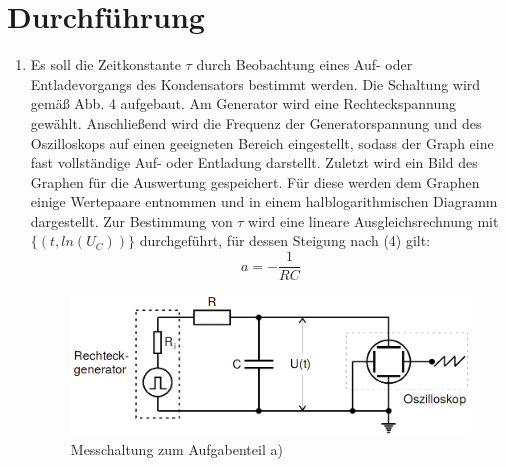 \section{Durchführung}
\label{sec:Durchführung}


\renewcommand{\labelenumi}{\alph{enumi})}
\begin{enumerate}
  \item Es soll die Zeitkonstante $\tau$ durch Beobachtung eines Auf- oder Entladevorgangs
  des Kondensators bestimmt werden. Die Schaltung wird gemäß Abb. 4 aufgebaut. Am Generator wird eine Rechteckspannung gewählt.
  Anschließend wird die Frequenz der Generatorspannung und des Oszilloskops auf einen
  geeigneten Bereich eingestellt, sodass der Graph eine fast vollständige Auf- oder Entladung darstellt. Zuletzt wird ein Bild des Graphen für die
  Auswertung gespeichert. Für diese werden dem Graphen einige Wertepaare entnommen und in einem
  halblogarithmischen Diagramm dargestellt. Zur Bestimmung von $\tau$ wird eine
  lineare Ausgleichsrechnung mit $\{(t, ln(U_C))\}$ durchgeführt, für dessen Steigung nach (4) gilt:
  \begin{equation}
  a = -\frac{1}{RC}
  \end{equation}
  \begin{figure}[H]
  	\centering
  	\includegraphics[width=\linewidth-200pt,height=\textheight-200pt,keepaspectratio]{content/Aufgabea.png}
  	\caption{Messchaltung zum Aufgabenteil a) \cite{V353}}
  	\label{fig:Aufbaua}
  \end{figure}


\end{enumerate}
